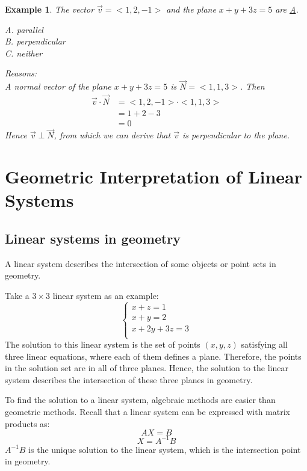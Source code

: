\documentclass{article}
\newtheorem{example}{Example}
\begin{document}
\begin{example}
  The vector $\vec{v} = <1, 2, -1>$ and the plane $x + y + 3z = 5$ are \underline{A}.

  A. parallel \\
  B. perpendicular \\
  C. neither

  Reasons: \\
  A normal vector of the plane $x + y + 3z = 5$ is $\vec{N} = <1, 1, 3>$. Then
  \[
    \begin{split}
    \vec{v} \cdot \vec{N} &= <1, 2, -1> \cdot <1, 1, 3> \\
                          &= 1 + 2 - 3 \\
                          &= 0
    \end{split}
  \]
  Hence $\vec{v} \perp \vec{N}$, from which we can derive that $\vec{v}$ is 
  perpendicular to the plane.
\end{example}

\section{Geometric Interpretation of Linear Systems}

\subsection{Linear systems in geometry}

A linear system describes the intersection of some objects or point sets in 
geometry.

Take a $3 \times 3$ linear system as an example:
\[
  \left\{ \begin{array}{ll}
  x + z = 1 \\
  x + y = 2 \\
  x + 2y + 3z = 3 \\
  \end{array} \right.
\]
The solution to this linear system is the set of points $(x, y, z)$ satisfying 
all three linear equations, where each of them defines a plane. Therefore, the 
points in the solution set are in all of three planes. Hence, the solution to 
the linear system describes the intersection of these three planes in geometry.

To find the solution to a linear system, algebraic methods are easier than 
geometric methods. Recall that a linear system can be expressed with matrix 
products as:
\[
  AX = B
\]
\[
  X = A^{-1}B
\]
$A^{-1}B$ is the unique solution to the linear system, which is the 
intersection point in geometry.
\end{document}
